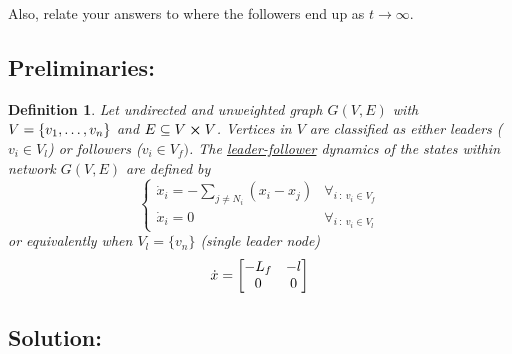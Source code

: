 \documentclass[]{article}
\numberwithin{equation}{section}
\newcommand{\st}{\ : \ }
\newtheorem{definition}{Definition}
\begin{document}
Also, relate your answers to where the followers end up as $t \to \infty$.

\subsection*{Preliminaries:}
\begin{definition}\label{def:leader_follower_dynamics}
    Let undirected and unweighted graph $G(V,E)$ with $V = \qty{v_1,\dots,v_n}$ and $E \subseteq V \cross V$.
    Vertices in $V$ are classified as either \emph{leaders} ($v_i \in V_l$) or \emph{followers} ($v_i \in V_f)$. 
	The \emph{\underline{leader-follower}} dynamics of the states within network $G(V,E)$ are defined by\[\begin{cases}
        \dot{x}_i = - \sum_{j \neq N_i} (x_i - x_j) &\forall_{i \st v_i \in V_{f}}\\
        \dot{x}_i =  0 &\forall_{i \st v_i \in V_{l}}
    \end{cases}
	\] or equivalently when $V_{l} = \{v_n\}$ (single leader node) \[
        \dot{x} = \mqty[
            -L_f & - l\\
            0 & 0
        ]
    \]
\end{definition}

\subsection*{Solution:}




\end{document}
